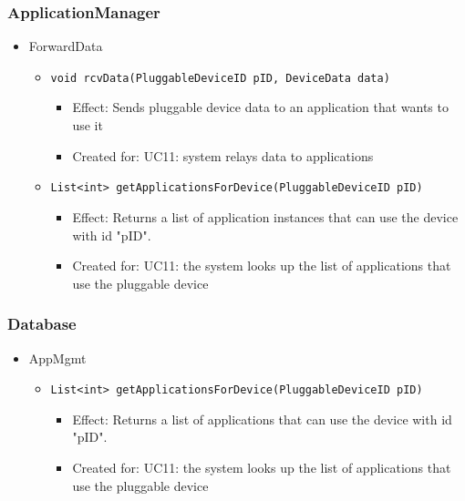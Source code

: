     \subsubsection{ApplicationManager}
        \begin{itemize}
            \item ForwardData
            \begin{itemize}
                \item \texttt{void rcvData(PluggableDeviceID pID, DeviceData data)}
                    \begin{itemize}
                        \item Effect: Sends pluggable device data to an application that wants to use it
                        \item Created for: UC11: system relays data to applications
                    \end{itemize}
                \item \texttt{List<int> getApplicationsForDevice(PluggableDeviceID pID)}
                    \begin{itemize}
                        \item Effect: Returns a list of application instances that can use the device with id "pID".
                        \item Created for: UC11: the system looks up the list of applications that use the pluggable device
                    \end{itemize}
            \end{itemize}
        \end{itemize}

    \subsubsection{Database}
        \begin{itemize}
            \item AppMgmt
            \begin{itemize}
                \item \texttt{List<int> getApplicationsForDevice(PluggableDeviceID pID)}
                    \begin{itemize}
                        \item Effect: Returns a list of applications that can use the device with id "pID".
                        \item Created for: UC11: the system looks up the list of applications that use the pluggable device
                    \end{itemize}
            \end{itemize}
        \end{itemize}


